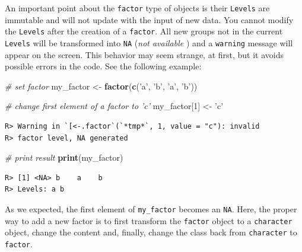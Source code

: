 \documentclass[
  12pt,
]{book}
\newenvironment{Shaded}{\begin{snugshade}}{\end{snugshade}}
\newcommand{\CommentTok}[1]{\textcolor[rgb]{0.37,0.37,0.37}{\textit{#1}}}
\newcommand{\DecValTok}[1]{\textcolor[rgb]{0.06,0.06,0.06}{#1}}
\newcommand{\KeywordTok}[1]{\textcolor[rgb]{0.27,0.27,0.27}{\textbf{#1}}}
\newcommand{\NormalTok}[1]{#1}
\newcommand{\StringTok}[1]{\textcolor[rgb]{0.5,0.5,0.5}{#1}}
\begin{document}
An important point about the \texttt{factor} type of objects is their \texttt{Levels} are immutable and will not update with the input of new data. You cannot modify the \texttt{Levels} after the creation of a \texttt{factor}. All new groups not in the current \texttt{Levels} will be transformed into \texttt{NA} (\emph{not available} ) and a \texttt{warning} message will appear on the screen. This behavior may seem strange, at first, but it avoids possible errors in the code. See the following example:

\begin{Shaded}
\begin{Highlighting}[]
\CommentTok{# set factor}
\NormalTok{my_factor <-}\StringTok{ }\KeywordTok{factor}\NormalTok{(}\KeywordTok{c}\NormalTok{(}\StringTok{'a'}\NormalTok{, }\StringTok{'b'}\NormalTok{, }\StringTok{'a'}\NormalTok{, }\StringTok{'b'}\NormalTok{))}

\CommentTok{# change first element of a factor to 'c'}
\NormalTok{my_factor[}\DecValTok{1}\NormalTok{] <-}\StringTok{ 'c'}
\end{Highlighting}
\end{Shaded}

\begin{verbatim}
R> Warning in `[<-.factor`(`*tmp*`, 1, value = "c"): invalid
R> factor level, NA generated
\end{verbatim}

\begin{Shaded}
\begin{Highlighting}[]
\CommentTok{# print result}
\KeywordTok{print}\NormalTok{(my_factor)}
\end{Highlighting}
\end{Shaded}

\begin{verbatim}
R> [1] <NA> b    a    b   
R> Levels: a b
\end{verbatim}

As we expected, the first element of \texttt{my\_factor} becomes an \texttt{NA}. Here, the proper way to add a new factor is to first transform the \texttt{factor} object to a \texttt{character} object, change the content and, finally, change the class back from \texttt{character} to \texttt{factor}. 
\end{document}
